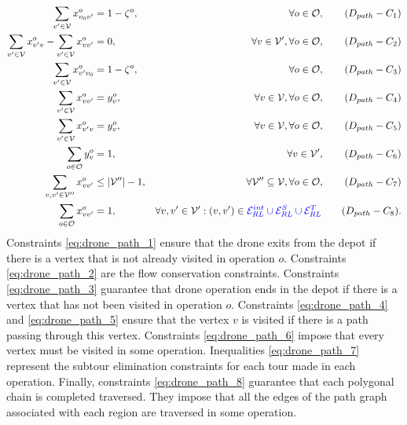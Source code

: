 \documentclass[12pt]{elsarticle}
\newcommand{\CV}[1]{{\color{blue}#1}}
\begin{document}
\begin{align*}
\sum_{v'\in \mathcal V} x_{v_0v'}^{o}&=1-\zeta^o,&\quad \forall o\in\mathcal O,\label{eq:drone_path_1}\tag{$D_{path}-C_1$}\\
\sum_{v'\in\mathcal V} x_{v'v}^{o}-\sum_{v'\in\mathcal V}x_{vv'}^{o}&=0,&\quad\forall v\in\mathcal V',\forall o\in\mathcal O,\label{eq:drone_path_2}\tag{$D_{path}-C_2$}\\
\sum_{v'\in\mathcal V} x_{v'v_0}^{o}&=1-\zeta^o,&\quad\forall o\in\mathcal O,\label{eq:drone_path_3}\tag{$D_{path}-C_3$}\\
\sum_{v'\in\mathcal V} x_{vv'}^o&=y_{v}^o,&\quad\forall v\in\mathcal V,\forall o\in\mathcal O,\label{eq:drone_path_4}\tag{$D_{path}-C_4$}\\
\sum_{v'\in\mathcal V} x_{v'v}^o&=y_{v}^o,&\quad\forall v\in\mathcal V,\forall o\in\mathcal O,\label{eq:drone_path_5}\tag{$D_{path}-C_5$}\\
\sum_{o\in\mathcal O}y_v^o&=1,&\quad\forall v\in\mathcal V',\label{eq:drone_path_6}\tag{$D_{path}-C_6$}\\
\sum_{v,v'\in \mathcal V''} x_{vv'}^o&\leq |\mathcal V''|-1,&\forall \mathcal V''\subseteq\mathcal V,\forall o\in\mathcal O,\label{eq:drone_path_7}\tag{$D_{path}-C_7$}\\
\sum_{o\in\mathcal O} x_{vv'}^o &= 1, &\forall v,v'\in\mathcal V':(v,v')\in\CV{\mathcal E_{RL}^{int}\cup\mathcal E_{RL}^ S\cup\mathcal E_{RL}^T}\label{eq:drone_path_8}\tag{$D_{path}-C_8$}. 
\end{align*}
Constraints \eqref{eq:drone_path_1} ensure that the drone exits from the depot if there is a vertex that is not already visited in operation $o$. Constraints \eqref{eq:drone_path_2} are the flow conservation constraints. Constraints \eqref{eq:drone_path_3} guarantee that drone operation ends in the depot if there is a vertex that has not been visited in operation $o$. Constraints \eqref{eq:drone_path_4} and \eqref{eq:drone_path_5} ensure that the vertex $v$ is visited if there is a path passing through this vertex. Constraints \eqref{eq:drone_path_6} impose that every vertex must be visited in some operation. Inequalities \eqref{eq:drone_path_7} represent the subtour elimination constraints for each tour made in each operation. Finally, constraints \eqref{eq:drone_path_8}
guarantee that each polygonal chain is completed traversed. They impose that all the edges of the path graph associated with each region are traversed in some operation.
\end{document}
